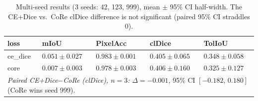 \begin{table}
\caption{Multi-seed results (3 seeds: 42, 123, 999), mean $\pm$ 95\% CI half-width.
The CE+Dice vs.\ CoRe clDice difference is not significant (paired 95\% CI straddles 0).}
\centering
\begin{tabular}{lllll}
\toprule
loss & mIoU & PixelAcc & clDice & TolIoU \\
\midrule
ce\_dice & $0.051\pm0.027$ & $0.983\pm0.001$ & $0.405\pm0.065$ & $0.348\pm0.058$ \\
core    & $0.007\pm0.003$ & $0.978\pm0.003$ & $0.406\pm0.160$ & $0.325\pm0.127$ \\
\midrule
\multicolumn{5}{l}{\emph{Paired CE+Dice$-$CoRe (clDice), $n{=}3$:} $\Delta=-0.001$,
95\% CI $[-0.182,\,0.180]$ (CoRe wins seed 999).} \\
\bottomrule
\end{tabular}
\end{table}
